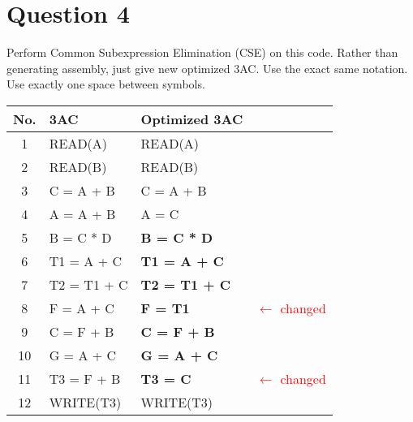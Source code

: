 \documentclass{article}
\newcommand{\textr}[1]{\textcolor{red}{#1}}
\begin{document}
\section*{Question 4}
Perform Common Subexpression Elimination (CSE) on this code. Rather than generating assembly, just give new optimized 3AC. Use the exact same notation. Use exactly one space between symbols. \\
\begin{tabular}{|c|l|l|l}
  \hline
  \textbf{No.} & \textbf{3AC} & \textbf{Optimized 3AC} \\
  \hline
  1   & READ(A)     & READ(A) \\
  \hline
  2   & READ(B)     & READ(B) \\
  \hline
  3   & C = A + B   & C = A + B \\
  \hline
  4   & A = A + B   & A = C \\
  \hline
  5   & B = C * D   & \textbf{B = C * D} \\
  \hline
  6   & T1 = A + C  & \textbf{T1 = A + C} \\
  \hline
  7   & T2 = T1 + C & \textbf{T2 = T1 + C} \\
  \hline
  8   & F = A + C   & \textbf{F = T1} & \textr{$\leftarrow$ changed} \\
  \hline
  9   & C = F + B   & \textbf{C = F + B} \\
  \hline
  10  & G = A + C   & \textbf{G = A + C} \\
  \hline
  11  & T3 = F + B  & \textbf{T3 = C} & \textr{$\leftarrow$ changed} \\
  \hline
  12  & WRITE(T3)   & WRITE(T3) \\
  \hline
\end{tabular}


\newpage
\end{document}
